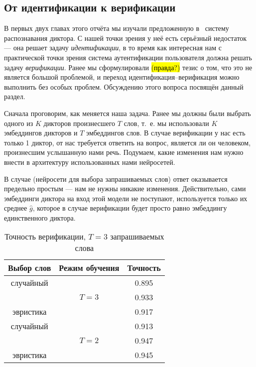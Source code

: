 \subsection{От идентификации к верификации}\label{ssec:verification}

В первых двух главах этого отчёта мы изучали предложенную в~\citeisr{} систему
распознавания диктора. С нашей точки зрения у неё есть серьёзный недостаток ---
она решает задачу \emph{идентификации}, в то время как интересная нам с
практической точки зрения система аутентификации пользователя должна решать
задачу \emph{верификации}. Ранее мы сформулировали \hl{(правда?)} тезис о том,
что это не является большой проблемой, и переход идентификация--верификация
можно выполнить без особых проблем. Обсуждению этого вопроса посвящён данный
раздел.

Сначала проговорим, как меняется наша задача. Ранее мы должны были выбрать
одного из $K$ дикторов произнесшего $T$ слов, т.~е. мы использовали $K$
эмбеддингов дикторов и $T$ эмбеддингов слов. В случае верификации у нас есть
только 1 диктор, от нас требуется ответить на вопрос, является ли он человеком,
произнесшим услышанную нами речь. Подумаем, какие изменения нам нужно внести
в архитектуру использованных нами нейросетей.

В случае \enquirer{} (нейросети для выбора запрашиваемых слов) ответ оказывается
предельно простым --- нам не нужны никакие изменения. Действительно, сами
эмбеддинги диктора на вход этой модели не поступают, используется только их
среднее $\hat{g}$, которое в случае верификации будет просто равно эмбеддингу
единственного диктора.

\begin{table}[htb]
    \centering
    \begin{tabular}{c c c}
        \toprule
        Выбор слов & Режим обучения & Точность\\
        \midrule
        случайный & \multirow{3}{4em}{$T = 3$} & 0.895 \\
        \enquirer{} & & 0.933\\
        эвристика & & 0.917\\
        \midrule
        случайный & \multirow{3}{4em}{$T = 2$} & 0.913 \\
        \enquirer{} & & 0.947\\
        эвристика & & 0.945\\
        \bottomrule
    \end{tabular}
    \caption{Точность верификации, $T = 3$ запрашиваемых слова}
    \label{tab:ver}
\end{table}

